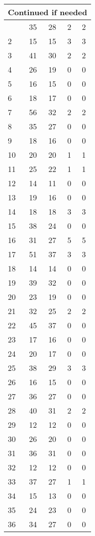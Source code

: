 \begin{center}
\begin{longtable}{l|c|c|c|c}
\hline \multicolumn{5}{|r|}{{Continued if needed}} \\ \hline
\endfoot 
1 & 35 & 28 & 2 & 2\\ \hline
2 & 15 & 15 & 3 & 3\\ \hline
3 & 41 & 30 & 2 & 2\\ \hline
4 & 26 & 19 & 0 & 0\\ \hline
5 & 16 & 15 & 0 & 0\\ \hline
6 & 18 & 17 & 0 & 0\\ \hline
7 & 56 & 32 & 2 & 2\\ \hline
8 & 35 & 27 & 0 & 0\\ \hline
9 & 18 & 16 & 0 & 0\\ \hline
10 & 20 & 20 & 1 & 1\\ \hline
11 & 25 & 22 & 1 & 1\\ \hline
12 & 14 & 11 & 0 & 0\\ \hline
13 & 19 & 16 & 0 & 0\\ \hline
14 & 18 & 18 & 3 & 3\\ \hline
15 & 38 & 24 & 0 & 0\\ \hline
16 & 31 & 27 & 5 & 5\\ \hline
17 & 51 & 37 & 3 & 3\\ \hline
18 & 14 & 14 & 0 & 0\\ \hline
19 & 39 & 32 & 0 & 0\\ \hline
20 & 23 & 19 & 0 & 0\\ \hline
21 & 32 & 25 & 2 & 2\\ \hline
22 & 45 & 37 & 0 & 0\\ \hline
23 & 17 & 16 & 0 & 0\\ \hline
24 & 20 & 17 & 0 & 0\\ \hline
25 & 38 & 29 & 3 & 3\\ \hline
26 & 16 & 15 & 0 & 0\\ \hline
27 & 36 & 27 & 0 & 0\\ \hline
28 & 40 & 31 & 2 & 2\\ \hline
29 & 12 & 12 & 0 & 0\\ \hline
30 & 26 & 20 & 0 & 0\\ \hline
31 & 36 & 31 & 0 & 0\\ \hline
32 & 12 & 12 & 0 & 0\\ \hline
33 & 37 & 27 & 1 & 1\\ \hline
34 & 15 & 13 & 0 & 0\\ \hline
35 & 24 & 23 & 0 & 0\\ \hline
36 & 34 & 27 & 0 & 0\\ \hline

\end{longtable}
\end{center}
